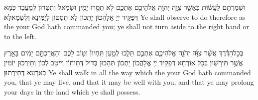 {וּשְׁמַרְתֶּ֣ם לַעֲשׂ֔וֹת כַּאֲשֶׁ֥ר צִוָּ֛ה יְהֹוָ֥ה אֱלֹהֵיכֶ֖ם אֶתְכֶ֑ם לֹ֥א תָסֻ֖רוּ יָמִ֥ין וּשְׂמֹֽאל׃}
{וְתִטְּרוּן לְמֶעֱבַד כְּמָא דְּפַקֵּיד יְיָ אֱלָהֲכוֹן יָתְכוֹן לָא תִסְטוֹן לְיַמִּינָא וְלִשְׂמָאלָא׃}
{Ye shall observe to do therefore as the \lord\space your God hath commanded you; ye shall not turn aside to the right hand or to the left.}{}

{בְּכׇל\maqqaf הַדֶּ֗רֶךְ אֲשֶׁ֨ר צִוָּ֜ה יְהֹוָ֧ה אֱלֹהֵיכֶ֛ם אֶתְכֶ֖ם תֵּלֵ֑כוּ לְמַ֤עַן תִּֽחְיוּן֙ וְט֣וֹב לָכֶ֔ם וְהַאֲרַכְתֶּ֣ם יָמִ֔ים בָּאָ֖רֶץ אֲשֶׁ֥ר תִּֽירָשֽׁוּן׃}
{בְּכָל אוֹרְחָא דְּפַקֵּיד יְיָ אֱלָהֲכוֹן יָתְכוֹן תְּהָכוּן בְּדִיל דְּתֵיחוֹן וְיִיטַב לְכוֹן וְתֵירְכוּן יוֹמִין בְּאַרְעָא דְּתֵירְתוּן׃}
{Ye shall walk in all the way which the \lord\space your God hath commanded you, that ye may live, and that it may be well with you, and that ye may prolong your days in the land which ye shall possess.}{}

